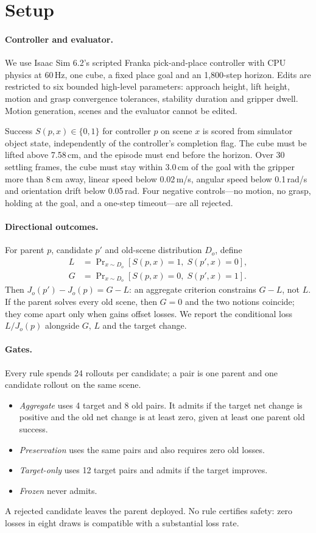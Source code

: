 \documentclass[letterpaper]{article} %
\begin{document}
\section{Setup}
\paragraph{Controller and evaluator.} We use Isaac Sim 6.2's scripted Franka pick-and-place controller \citep{nvidia2026franka} with CPU physics at 60\,Hz, one cube, a fixed place goal and an 1{,}800-step horizon. Edits are restricted to six bounded high-level parameters: approach height, lift height, motion and grasp convergence tolerances, stability duration and gripper dwell. Motion generation, scenes and the evaluator cannot be edited.

Success $S(p,x)\in\{0,1\}$ for controller $p$ on scene $x$ is scored from simulator object state, independently of the controller's completion flag. The cube must be lifted above 7.58\,cm, and the episode must end before the horizon. Over 30 settling frames, the cube must stay within 3.0\,cm of the goal with the gripper more than 8\,cm away, linear speed below 0.02\,m/s, angular speed below 0.1\,rad/s and orientation drift below 0.05\,rad. Four negative controls---no motion, no grasp, holding at the goal, and a one-step timeout---are all rejected.

\paragraph{Directional outcomes.} For parent $p$, candidate $p'$ and old-scene distribution $D_o$, define
\begin{align*}
L &= \Pr\nolimits_{x\sim D_o}[S(p,x)=1,\; S(p',x)=0],\\
G &= \Pr\nolimits_{x\sim D_o}[S(p,x)=0,\; S(p',x)=1].
\end{align*}
Then $J_o(p')-J_o(p)=G-L$: an aggregate criterion constrains $G-L$, not $L$. If the parent solves every old scene, then $G=0$ and the two notions coincide; they come apart only when gains offset losses. We report the conditional loss $L/J_o(p)$ alongside $G$, $L$ and the target change.

\paragraph{Gates.} Every rule spends 24 rollouts per candidate; a pair is one parent and one candidate rollout on the same scene.
\begin{itemize}
\item \emph{Aggregate} uses 4 target and 8 old pairs. It admits if the target net change is positive and the old net change is at least zero, given at least one parent old success.
\item \emph{Preservation} uses the same pairs and also requires zero old losses.
\item \emph{Target-only} uses 12 target pairs and admits if the target improves.
\item \emph{Frozen} never admits.
\end{itemize}
A rejected candidate leaves the parent deployed. No rule certifies safety: zero losses in eight draws is compatible with a substantial loss rate.
\end{document}
